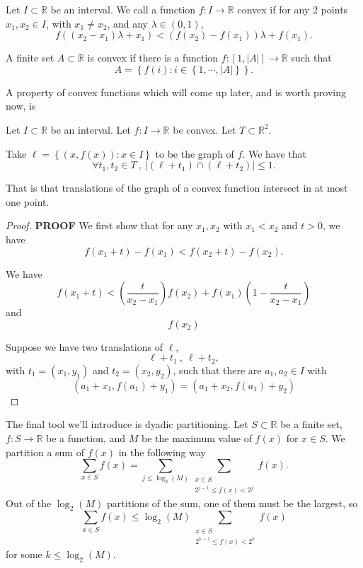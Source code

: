 \documentclass[12pt,reqno]{amsart}
\begin{document}
Let \(I \subset \mathbb{R} \) be an interval. 
    We call a function \(f: I \to \mathbb{R} \) convex if for
    any 2 points \(x_1,x_2 \in I\), with \(x_1 \neq x_2\), and any \(\lambda \in (0,1)\),
    \[
        f((x_2-x_1)\lambda + x_1) < \left( f(x_2)-f(x_1) \right) \lambda + f(x_1)
    .\]

    A finite set \(A \subset \mathbb{R}\) is convex if there is a function \(f: [1, \left\lvert A \right\rvert ] \to \mathbb{R} \)
such that
\[
    A = \left\{ f(i) : i \in \left\{ 1, \cdots , \left\lvert A \right\rvert  \right\}  \right\} 
.\]

A property of convex functions which will come up later, and is worth proving now, is
\begin{lemma}
Let \(I \subset \mathbb{R} \) be an interval. Let \(f : I \to \mathbb{R} \) be convex. Let \(T \subset \mathbb{R} ^{2}\).

Take \(\ell  = \left\{ (x,f(x)) : x \in I \right\} \) to be the graph of \(f\). We have that
\[
    \forall t_1,t_2 \in T ~,~ \left\lvert \left( \ell + t_1 \right) \cap \left( \ell +  t_2 \right)  \right\rvert   \leq  1
.\]

That is that translations of the graph of a convex function intersect in at most one point.
\end{lemma}

\begin{proof}
    \textbf{PROOF}
We first show that for any \(x_1, x_2\) with \(x_1 < x_2\) and \(t > 0\), we have
\[
    f(x_1 + t) - f(x_1) < f(x_2 + t) - f(x_2)
.\]

We have
\[
    f(x_1 + t) < \left( \frac{t}{x_2-x_1}  \right) f(x_2)+ f(x_1)\left( 1-\frac{t}{x_2-x_1}  \right) 
\]
and
\[
    f(x_2)
\]



Suppose we have two translations of \(\ell \),
\[
    \ell + t_1 ~,~ \ell +t_2
,\]
with \(t_1 = (x_1,y_1)\) and \(t_2 = (x_2,y_2)\), such that there are \(a_1,a_2 \in I\) with
\[
(a_1 + x_1, f(a_1) +y_1) = (a_1 + x_2, f(a_1) + y_2)
\]
\end{proof}

The final tool we'll introduce is dyadic partitioning. Let \(S \subset \mathbb{R} \) be a finite set, \(f: S \to \mathbb{R} \) be a function,
and \(M\) be the maximum value of \(f(x)\) for \(x \in S\). We partition a sum of
\(f(x)\) in the following way
\[
    \sum _{x \in S} f(x) = \sum _{j \leq \log _{2} \left( M \right)} \sum _{\substack{ x \in S \\ 2^{j-1} \leq f(x) < 2^{j} }} f(x)
.\]
Out of the \(\log _{2} \left( M \right) \) partitions of the sum, one of them must be the largest, so
\[
    \sum _{x \in S} f(x) \leq  \log _{2} \left( M \right)  \sum _{\substack{ x \in S \\ 2^{k-1} \leq f(x) < 2^{k} }} f(x)
\]
for some \(k \leq \log _{2} \left( M \right) \).
\end{document}
